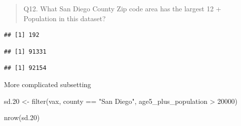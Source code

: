 \documentclass[
]{article}
\newenvironment{Shaded}{\begin{snugshade}}{\end{snugshade}}
\newcommand{\DecValTok}[1]{\textcolor[rgb]{0.00,0.00,0.81}{#1}}
\newcommand{\FloatTok}[1]{\textcolor[rgb]{0.00,0.00,0.81}{#1}}
\newcommand{\FunctionTok}[1]{\textcolor[rgb]{0.00,0.00,0.00}{#1}}
\newcommand{\NormalTok}[1]{#1}
\newcommand{\OtherTok}[1]{\textcolor[rgb]{0.56,0.35,0.01}{#1}}
\newcommand{\SpecialCharTok}[1]{\textcolor[rgb]{0.00,0.00,0.00}{#1}}
\newcommand{\StringTok}[1]{\textcolor[rgb]{0.31,0.60,0.02}{#1}}
\begin{document}
\begin{quote}
Q12. What San Diego County Zip code area has the largest 12 + Population
in this dataset?
\end{quote}

\begin{Shaded}
\end{Shaded}

\begin{verbatim}
## [1] 192
\end{verbatim}

\begin{Shaded}
\end{Shaded}

\begin{verbatim}
## [1] 91331
\end{verbatim}

\begin{Shaded}
\end{Shaded}

\begin{verbatim}
## [1] 92154
\end{verbatim}

More complicated subsetting

\begin{Shaded}
\begin{Highlighting}[]
\NormalTok{sd}\FloatTok{.20} \OtherTok{\textless{}{-}} \FunctionTok{filter}\NormalTok{(vax, county }\SpecialCharTok{==} \StringTok{"San Diego"}\NormalTok{, }
\NormalTok{       age5\_plus\_population }\SpecialCharTok{\textgreater{}} \DecValTok{20000}\NormalTok{)}

\FunctionTok{nrow}\NormalTok{(sd}\FloatTok{.20}\NormalTok{)}
\end{Highlighting}
\end{Shaded}
\end{document}
